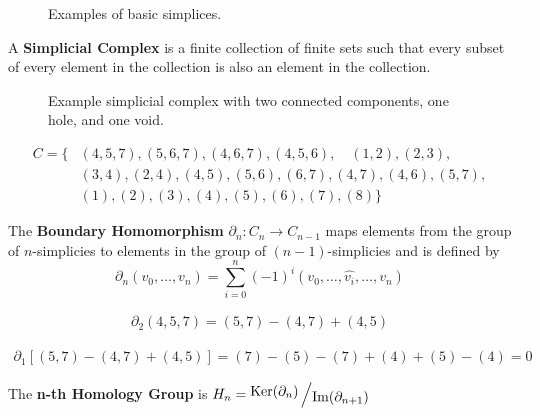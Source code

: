 \begin{figure}[h!]
    
    \caption{Examples of basic simplices.}
\end{figure}

\begin{definition}\label{defsimpcomp}
    A \textbf{Simplicial Complex} is a finite collection of finite sets such that every subset of every element in the collection is also an element in the collection. \cite{wagner}
\end{definition}

\begin{figure}[h!]
    
    \caption{Example simplicial complex with two connected components, one hole, and one void.}
\end{figure}

\begin{align*}
    C = \{
        &(4,5,7), (5,6,7), (4,6,7), (4,5,6),\quad (1,2), (2,3),\\ &(3,4), (2,4), (4,5), (5,6),(6,7),(4,7),(4,6),(5,7),\\
        &(1), (2), (3), (4), (5), (6), (7), (8)
    \}
\end{align*}

\begin{definition}\label{defbndhom}
    The \textbf{Boundary Homomorphism} \(\partial_n : C_n \to C_{n-1}\) maps elements from the group of \(n\)-simplicies to elements in the group of \((n-1)\)-simplicies and is defined by
    \[
        \partial_n (v_0,\dots , v_{n}) = \sum_{i=0}^n (-1)^{i}
        (v_0,\dots, \widehat{v_i}, \dots, v_n)
    \]
    \cite{hatcher}
\end{definition}

\begin{align*}
    \partial_2 (4,5,7) = (5,7) - (4,7) + (4,5)
\end{align*}

\begin{align*}
    \partial_1 [(5,7) - (4,7) + (4,5)] = (7) - (5) - (7) + (4) + (5) - (4) = 0
\end{align*}

\begin{definition}\label{defhomgrp}
    The \textbf{n-th Homology Group} is \(H_n = \bigslant{\Ker(\partial_n)}{\Ima(\partial_{n+1})}\)
    \cite{fraleigha}
\end{definition}

\begin{figure}[h!]
    \scalebox{.8}{
        
    }
\end{figure}

